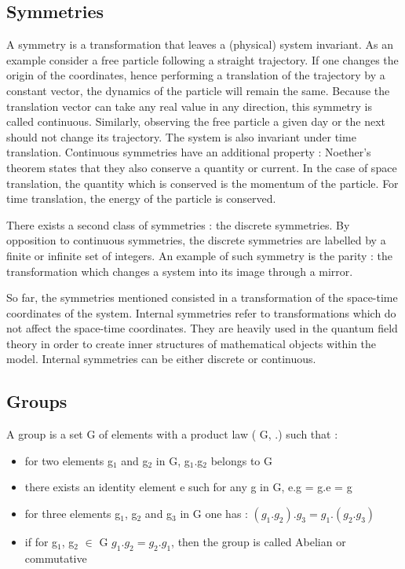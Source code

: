 \subsection{Symmetries}
\label{sec:org0eb9ce7}

A symmetry is a transformation that leaves a (physical) system invariant.
As an example consider a free particle following a straight trajectory.
If one changes the origin of the coordinates, hence performing a translation of the trajectory by a constant vector, the dynamics of the particle will remain the same.
Because the translation vector can take any real value in any direction, this symmetry is called continuous.
Similarly, observing the free particle a given day or the next should not change its trajectory.
The system is also invariant under time translation.
Continuous symmetries have an additional property : Noether's theorem \cite{Noether} states that they also conserve a quantity or current.
In the case of space translation, the quantity which is conserved is the momentum of the particle.
For time translation, the energy of the particle is conserved.

There exists a second class of symmetries : the discrete symmetries.
By opposition to continuous symmetries, the discrete symmetries are labelled by a finite or infinite set of integers.
An example of such symmetry is the parity : the transformation which changes a system into its image through a mirror.

So far, the symmetries mentioned consisted in a transformation of the space-time coordinates of the system.
Internal symmetries refer to transformations which do not affect the space-time coordinates.
They are heavily used in the quantum field theory in order to create inner structures of mathematical objects within the model.
Internal symmetries can be either discrete or continuous.


\subsection{Groups}
\label{sec:org18fff70}

A group is a set G of elements with a product law ( G, .) such that :
\begin{itemize}
\item for two elements g\(_{\text{1}}\) and g\(_{\text{2}}\) in G, g\(_{\text{1}}\).g\(_{\text{2}}\) belongs to G
\item there exists an identity element e such for any g in G, e.g = g.e = g
\item for three elements g\(_{\text{1}}\), g\(_{\text{2}}\) and g\(_{\text{3}}\) in G one has : \((g_1.g_2).g_3=g_1.(g_2.g_3)\)
\item if for g\(_{\text{1}}\), g\(_{\text{2}}\) \(\in\) G \(g_1.g_2=g_2.g_1\), then the group is called Abelian or commutative
\end{itemize}

